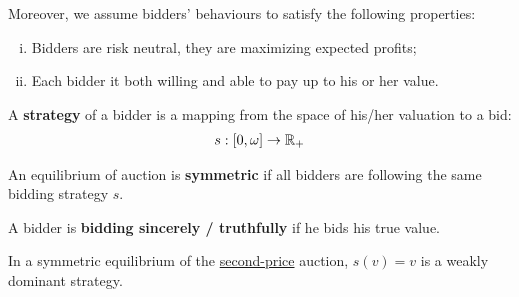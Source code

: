 \documentclass{article}
\begin{document}
	\begin{assumption}
		Moreover, we assume bidders' behaviours to satisfy the following properties:
		\begin{enumerate}[(i)]
			\item Bidders are risk neutral, they are maximizing expected profits;
			\item Each bidder it both willing and able to pay up to his or her value.
		\end{enumerate}
	\end{assumption}
	
	\begin{definition}
		A \textbf{strategy} of a bidder is a mapping from the space of his/her valuation to a bid:
		\begin{align}
			s: [0, \omega] \to \mathbb{R}_+
		\end{align}
	\end{definition}
	
	\begin{definition}
		An equilibrium of auction is \textbf{symmetric} if all bidders are following the same bidding strategy $s$.
	\end{definition}
	
	\begin{definition}
		A bidder is \textbf{bidding sincerely / truthfully} if he bids his true value. 
	\end{definition}
	
	\begin{proposition}
		In a symmetric equilibrium of the \ul{second-price} auction, $s(v) = v$ is a weakly dominant strategy.
	\end{proposition}
	
\end{document}
